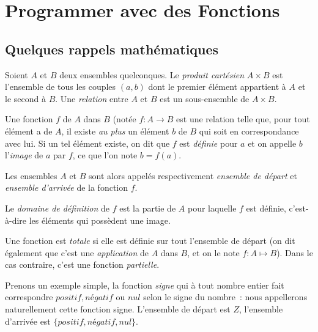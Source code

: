 
\chapter{Programmer avec des Fonctions}

%





\section{Quelques rappels mathématiques}

Soient $ A$ et $B$ deux ensembles quelconques. Le {\em produit cartésien}
$ A \times B$ est l'ensemble de tous les couples $(a,b)$ dont le premier 
élément appartient \`a $A$ et le second \`a $B$. 
Une {\em relation}  
entre $A$ et $B$ est un sous-ensemble de $A \times B$.

Une fonction  $f$ de $A$ dans $B$ (notée  $f : A \rightarrow B$ 
est une relation telle que, pour tout élément a de $A$, il existe 
{\em au plus} un élément $b$ de $B$ qui soit en correspondance 
avec lui. Si un tel élément existe, on dit que $f$ est {\em définie}
 pour $a$ et on appelle $b$ l'{\em image} de $a$ par $f$, ce que l'on note
$ b = f(a)$. 

Les ensembles $A$ et $B$ sont alors appelés respectivement {\em ensemble
 de départ} et {\em ensemble d'arrivée} de la fonction $f$.

Le {\em domaine de définition} de $f$ est la partie de $A$ pour laquelle $f$
 est définie, c'est-à-dire les éléments qui possèdent une image.

Une fonction est {\em totale} si elle est définie sur 
tout l'ensemble de départ 
(on dit également que c'est une {\em application} de $A$ dans $B$, et on
 le note $f : A \mapsto B$). Dans le cas contraire, 
c'est une fonction {\em partielle}.

Prenons un exemple simple, la fonction \textsl{signe} qui à tout
nombre entier fait correspondre $positif, négatif$ ou $nul$ selon le
signe du nombre~: nous appellerons naturellement cette fonction
signe. L'ensemble de départ est $Z$, l'ensemble d'arrivée est
$\{positif, négatif, nul\}$.

